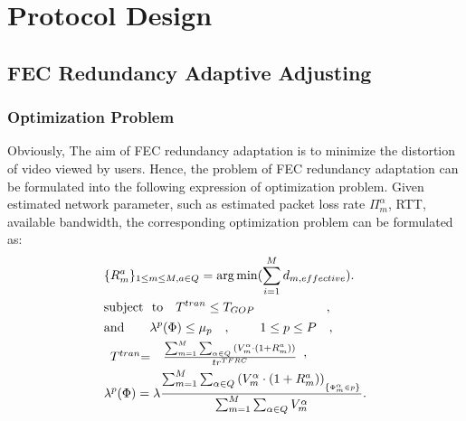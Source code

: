 
\section{Protocol Design}







\subsection{FEC Redundancy Adaptive Adjusting}
\subsubsection{Optimization Problem}

Obviously, The aim of FEC redundancy adaptation is to minimize the distortion of video viewed by users.
Hence, the problem of FEC redundancy adaptation can be formulated into the following expression of optimization problem.
Given estimated network parameter, such as estimated packet loss rate $\Pi _m^\alpha$, RTT, available bandwidth, the corresponding optimization problem can be formulated as:
\begin{eqnarray}
&{\{ R_m^a\} _{1 \le m \le M,a \in Q}} = \arg \min (\sum\limits_{i = 1}^M {d_{m,effective}}).  \\
&{\rm{subject}}{~~\rm{to}}{~~~T^{tran}} \le {T_{GOP}}~~~~~~~~~~~~~~~~~, \\
&{\rm{and}}{~~~~~~\lambda ^p}(\Phi ) \le {\mu _p}\begin{array}{*{20}{c}}
{}
\end{array}{\rm{}},{\rm{}}~~~~~~~1 \le p \le P~~~,\\
&\begin{array}{*{20}{c}}
{{T^{tran}}{\rm{ = }}}&{\frac{{\sum\nolimits_{m = 1}^M {\sum\nolimits_{\alpha  \in Q} {(V_m^\alpha  \cdot (1 + R_m^a))} } }}{{t{r^{TFRC}}}}}
\end{array},\\
&{\lambda ^p}(\Phi ) = \lambda \frac{{\sum\nolimits_{m = 1}^M {\sum\nolimits_{\alpha  \in Q} {{{(V_m^\alpha  \cdot (1 + R_m^a))}_{_{\left\{ {\Phi _m^\alpha  \in p} \right\}}}}} } }}{{\sum\nolimits_{m = 1}^M {\sum\nolimits_{\alpha  \in Q} {V_m^\alpha } } }}.
\end{eqnarray}

